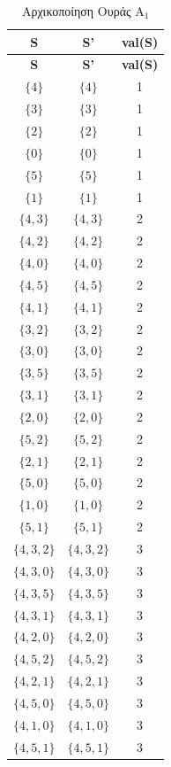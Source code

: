 \begin{longtable}{|c|c|c|}
	\caption{Αρχικοποίηση Ουράς $\text{Α}_{\text{1}}$} \\
	\hline
	\textbf{S} & \textbf{S'} & \textbf{val(S)} \\
	\hline
	\endfirsthead %
	\hline
	\textbf{S} & \textbf{S'} & \textbf{val(S)} \\
	\hline
	\endhead %
	$\{4\}$ & $\{4\}$ & 1 \\
	$\{3\}$ & $\{3\}$ & 1 \\
	$\{2\}$ & $\{2\}$ & 1 \\
	$\{0\}$ & $\{0\}$ & 1 \\
	$\{5\}$ & $\{5\}$ & 1 \\
	$\{1\}$ & $\{1\}$ & 1 \\
	$\{4,3\}$ & $\{4,3\}$ & 2 \\
	$\{4,2\}$ & $\{4,2\}$ & 2 \\
	$\{4,0\}$ & $\{4,0\}$ & 2 \\
	$\{4,5\}$ & $\{4,5\}$ & 2 \\
	$\{4,1\}$ & $\{4,1\}$ & 2 \\
	$\{3,2\}$ & $\{3,2\}$ & 2 \\
	$\{3,0\}$ & $\{3,0\}$ & 2 \\
	$\{3,5\}$ & $\{3,5\}$ & 2 \\
	$\{3,1\}$ & $\{3,1\}$ & 2 \\
	$\{2,0\}$ & $\{2,0\}$ & 2 \\
	$\{5,2\}$ & $\{5,2\}$ & 2 \\
	$\{2,1\}$ & $\{2,1\}$ & 2 \\
	$\{5,0\}$ & $\{5,0\}$ & 2 \\
	$\{1,0\}$ & $\{1,0\}$ & 2 \\
	$\{5,1\}$ & $\{5,1\}$ & 2 \\
	$\{4,3,2\}$ & $\{4,3,2\}$ & 3 \\
	$\{4,3,0\}$ & $\{4,3,0\}$ & 3 \\
	$\{4,3,5\}$ & $\{4,3,5\}$ & 3 \\
	$\{4,3,1\}$ & $\{4,3,1\}$ & 3 \\
	$\{4,2,0\}$ & $\{4,2,0\}$ & 3 \\
	$\{4,5,2\}$ & $\{4,5,2\}$ & 3 \\
	$\{4,2,1\}$ & $\{4,2,1\}$ & 3 \\
	$\{4,5,0\}$ & $\{4,5,0\}$ & 3 \\
	$\{4,1,0\}$ & $\{4,1,0\}$ & 3 \\
	$\{4,5,1\}$ & $\{4,5,1\}$ & 3 \\

\end{longtable}
